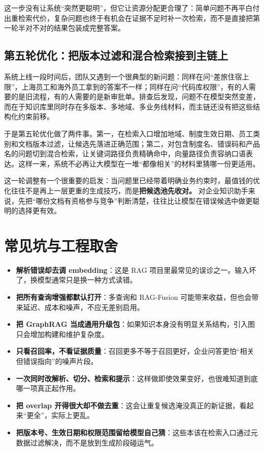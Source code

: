 这一步没有让系统“突然更聪明”，但它让资源分配更合理了：简单问题不再平白付出重检索代价，复杂问题也终于有机会在证据不足时补一次检索，而不是直接把第一轮半对不对的结果包装成完整答案。

\subsection{第五轮优化：把版本过滤和混合检索接到主链上}
系统上线一段时间后，团队又遇到一个很典型的新问题：同样在问“差旅住宿上限”，上海员工和海外员工拿到的答案不一样；同样在问“代码库权限”，有的人需要的是旧流程，有的人需要的是新审批单。排查后发现，问题不在模型突然变差，而在于知识库里同时存在多版本、多地域、多业务线材料，而主链还没有把这些结构化约束前移。

于是第五轮优化做了两件事。第一，在检索入口增加地域、制度生效日期、员工类别和文档版本过滤，让候选先落进正确范围；第二，对包含制度名、错误码和产品名的问题切到混合检索，让关键词路径负责精确命中，向量路径负责容纳口语表达。这样一来，系统不必再让大模型在一堆“都像相关”的材料里猜哪一份更适用。

这一轮调整有一个很重要的启发：当问题里已经带着明确业务约束时，最值钱的优化往往不是再上一层更重的生成技巧，而是\textbf{把候选池先收对。} 对企业知识助手来说，先把“哪份文档有资格参与竞争”判断清楚，往往比让模型在错误候选中做更聪明的选择更有效。

\section{常见坑与工程取舍}
\begin{itemize}
  \item \textbf{解析错误却去调 embedding}：这是 RAG 项目里最常见的误诊之一。输入坏了，换模型通常只是换一种方式读错。
  \item \textbf{把所有查询增强都默认打开}：多查询和 RAG-Fusion 可能带来收益，但也会带来延迟、成本和噪声，不应无差别启用。
  \item \textbf{把 GraphRAG 当成通用升级包}：如果知识本身没有明显关系结构，引入图只会增加构建和维护复杂度。
  \item \textbf{只看召回率，不看证据质量}：召回更多不等于召回更好，企业问答更怕“相关但错误指向”的噪声片段。
  \item \textbf{一次同时改解析、切分、检索和提示}：这样做即使效果变好，也很难知道到底哪一项真正起作用。
  \item \textbf{把 overlap 开得很大却不做去重}：这会让重复候选淹没真正的新证据，看起来“更全”，实际上更乱。
  \item \textbf{把版本号、生效日期和权限范围留给模型自己猜}：这些本该在检索入口通过元数据过滤解决，而不是放到生成阶段碰运气。
\end{itemize}

